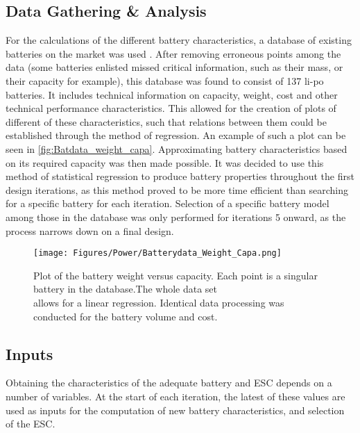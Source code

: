 \subsection{Data Gathering \& Analysis}
\label{sub:power_dataanalysis}

For the calculations of the different battery characteristics, a database of existing batteries on the market was used \cite{notion}. After removing erroneous points among the data (some batteries enlisted missed critical information, such as their mass, or their capacity for example), this database was found to consist of 137 li-po batteries. It includes technical information on capacity, weight, cost and other technical performance characteristics. This allowed for the creation of plots of different of these characteristics, such that relations between them could be established through the method of regression. An example of such a plot can be seen in \autoref{fig:Batdata_weight_capa}. Approximating battery characteristics based on its required capacity was then made possible. It was decided to use this method of statistical regression to produce battery properties throughout the first design iterations, as this method proved to be more time efficient than searching for a specific battery for each iteration. Selection of a specific battery model among those in the database was only performed for iterations 5 onward, as the process narrows down on a final design.

\begin{figure}[H]
    \centering
    \texttt{[image: Figures/Power/Batterydata\_Weight\_Capa.png]}
    \caption{Plot of the battery weight versus capacity. Each point is a singular battery in the database.The whole data set \\ allows for a linear regression. Identical data processing was conducted for the battery volume and cost.}
    \label{fig:Batdata_weight_capa}
\end{figure}




\subsection{Inputs}
\label{sub:powerinputs}
Obtaining the characteristics of the adequate battery and ESC depends on a number of variables. At the start of each iteration, the latest of these values are used as inputs for the computation of new battery characteristics, and selection of the ESC.

